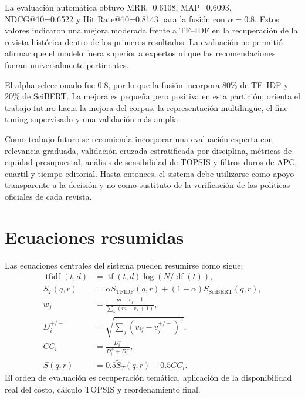 \documentclass[12pt,a4paper]{article}
\begin{document}
La evaluación automática obtuvo MRR=0.6108, MAP=0.6093, NDCG@10=0.6522 y Hit Rate@10=0.8143 para la fusión con $\alpha=0.8$. Estos valores indicaron una mejora moderada frente a TF--IDF en la recuperación de la revista histórica dentro de los primeros resultados. La evaluación no permitió afirmar que el modelo fuera superior a expertos ni que las recomendaciones fueran universalmente pertinentes.

El alpha seleccionado fue 0.8, por lo que la fusión incorpora 80\% de TF--IDF y 20\% de SciBERT. La mejora es pequeña pero positiva en esta partición; orienta el trabajo futuro hacia la mejora del corpus, la representación multilingüe, el fine-tuning supervisado y una validación más amplia.

Como trabajo futuro se recomienda incorporar una evaluación experta con relevancia graduada, validación cruzada estratificada por disciplina, métricas de equidad presupuestal, análisis de sensibilidad de TOPSIS y filtros duros de APC, cuartil y tiempo editorial. Hasta entonces, el sistema debe utilizarse como apoyo transparente a la decisión y no como sustituto de la verificación de las políticas oficiales de cada revista.

\appendix
\section{Ecuaciones resumidas}
Las ecuaciones centrales del sistema pueden resumirse como sigue:
\begin{align}
\operatorname{tfidf}(t,d)&=\operatorname{tf}(t,d)\log(N/\operatorname{df}(t)),\\
S_T(q,r)&=\alpha S_{\mathrm{TFIDF}}(q,r)+(1-\alpha)S_{\mathrm{SciBERT}}(q,r),\\
w_j&=\frac{m-r_j+1}{\sum_k(m-r_k+1)},\\
D_i^{+/-}&=\sqrt{\sum_j(v_{ij}-v_j^{+/-})^2},\\
CC_i&=\frac{D_i^-}{D_i^++D_i^-},\\
S(q,r)&=0.5\widetilde{S}_T(q,r)+0.5CC_i.
\end{align}
El orden de evaluación es recuperación temática, aplicación de la disponibilidad real del costo, cálculo TOPSIS y reordenamiento final.
\end{document}
